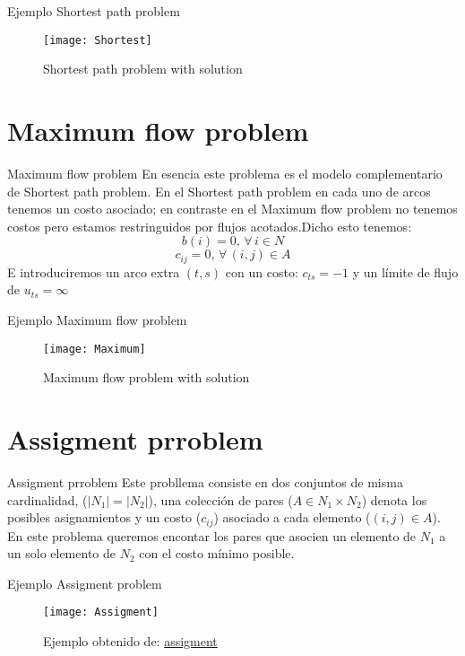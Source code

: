 \documentclass{beamer}
\begin{document}
\begin{frame}{Ejemplo Shortest path problem}
 \begin{figure} 
 \centering
  \texttt{[image: Shortest]}
  \caption{Shortest path problem with solution}
 \end{figure}

\end{frame}

\section{Maximum flow problem}
\begin{frame}{Maximum flow problem}
 En esencia este problema es el modelo complementario de Shortest path problem. \newline
 En el Shortest path problem en cada uno de arcos tenemos un costo asociado; en contraste en el Maximum flow problem no tenemos costos pero estamos restringuidos por flujos acotados.Dicho esto tenemos: $$b(i) = 0, \,  \forall \, i \in N$$
 $$c_{ij} = 0, \, \forall \, (i,j) \in A$$
 E introduciremos un arco extra $(t,s)$ con un costo: $c_{ts} = -1$ y un límite de flujo de $u_{ts} = \infty$
\end{frame}

\begin{frame}{Ejemplo Maximum flow problem}
\begin{figure}
 \centering
 \texttt{[image: Maximum]}
 \caption{Maximum flow problem with solution}
\end{figure}
 
\end{frame}

\section{Assigment prroblem}
\begin{frame}{Assigment prroblem}
 Este probllema consiste en dos conjuntos de misma cardinalidad, ($|N_1| = |N_2|$), una colección de pares ($A \in N_1 \times N_2$) denota los posibles asignamientos y un costo ($c_{ij}$) asociado a cada elemento ($(i,j) \in A$). En este problema queremos encontar los pares que asocien un elemento de $N_1$ a un solo elemento de $N_2$ con el costo mínimo posible. 
\end{frame}

\begin{frame}{Ejemplo Assigment problem}
 \begin{figure}
  \centering
  \texttt{[image: Assigment]}
  \caption{Ejemplo obtenido de: \href{https://slidetodoc.com/network-flow-problems-the-assignment-problem-consider-the/}{assigment}  }
 \end{figure}

\end{frame}
\end{document}
